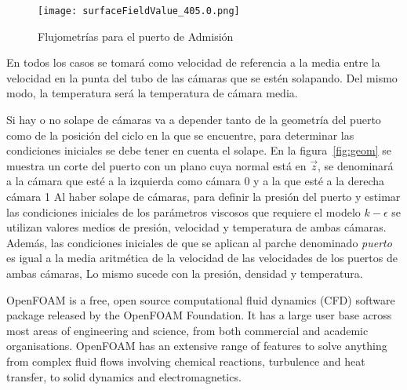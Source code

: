 \begin{figure}
    \centering
    \texttt{[image: surfaceFieldValue\_405.0.png]}
    \caption{Flujometrías para el puerto de Admisión}\label{fig:caudalMasico}
\end{figure}
En todos los casos se tomará como velocidad de referencia a la media entre la
velocidad en la punta del tubo de las cámaras que se estén solapando.
%
Del mismo modo, la temperatura será la temperatura de cámara media.

Si hay o no solape de cámaras va a depender tanto de la geometría del puerto
como de la posición del ciclo en la que se encuentre, para determinar las
condiciones iniciales se debe tener en cuenta el solape.
%
En la figura~\ref{fig:geom} se muestra un corte del puerto con un plano cuya
normal está en $\vec{z}$, se denominará a la cámara que esté a la izquierda
como cámara 0 y a la que esté a la derecha cámara 1
%
Al haber solape de cámaras, para definir la presión del puerto y estimar las
condiciones iniciales de los parámetros viscosos que requiere el modelo
$k-\epsilon$ se utilizan valores medios de presión, velocidad y temperatura de
ambas cámaras.
%
Además, las condiciones iniciales de que se aplican al parche denominado
\emph{puerto} es igual a la media aritmética de la velocidad de las velocidades
de los puertos de ambas cámaras, Lo mismo sucede con la presión, densidad y
temperatura.



OpenFOAM is a free, open source computational fluid dynamics (CFD) software
package released by the OpenFOAM Foundation.
%
It has a large user base across most areas of engineering and science, from both
commercial and academic organisations.
%
OpenFOAM has an extensive range of features to solve anything from complex fluid
flows involving chemical reactions, turbulence and heat transfer, to solid
dynamics and electromagnetics.
